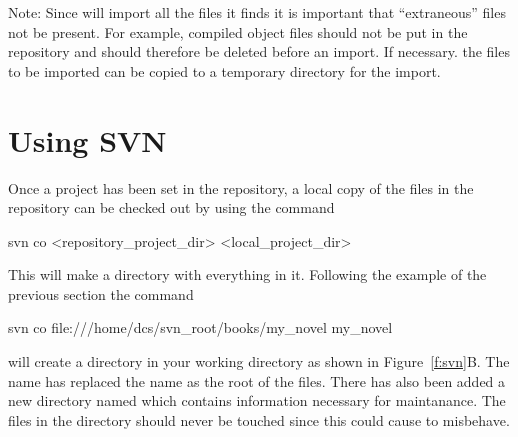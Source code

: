 Note: Since \svn will import all the files it finds it is important
that ``extraneous'' files not be present. For example, compiled object
files should not be put in the repository and should therefore be
deleted before an import. If necessary. the files to be imported can be
copied to a temporary directory for the import.

\section{Using SVN}
\label{s:svn_use}

Once a project has been set in the repository,
a local copy of the files in the
repository can be checked out by using the command
\begin{example}
  svn co <repository_project_dir> <local_project_dir>
\end{example}
This will make a directory  with everything in it.
Following the example of the previous section the command
\begin{example}
  svn co file:///home/dcs/svn_root/books/my_novel my_novel
\end{example}
will create a  directory in your working directory as shown in
Figure~\ref{f:svn}B. The name  has replaced the name
 as the root of the files. There has also been added a
new directory named  which contains information necessary for maintanance.
The files in the  directory should never be touched since
this could cause \svn to misbehave. 

